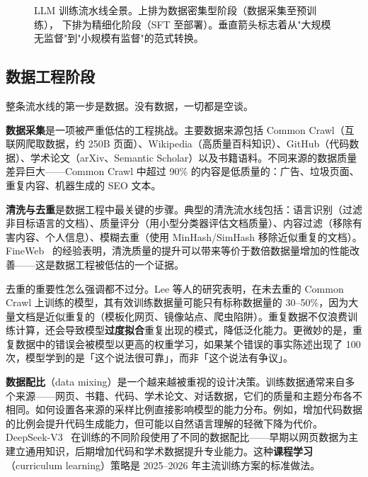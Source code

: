 \begin{figure}[htbp]
\caption{LLM 训练流水线全景。上排为数据密集型阶段（数据采集至预训练），
下排为精细化阶段（SFT 至部署）。垂直箭头标志着从"大规模无监督"到"小规模有监督"的范式转换。}
\label{fig:training-pipeline}
\end{figure}

\subsection{数据工程阶段}

整条流水线的第一步是数据。没有数据，一切都是空谈。

\textbf{数据采集}是一项被严重低估的工程挑战。主要数据来源包括 Common Crawl（互联网爬取数据，约 250B 页面）、Wikipedia（高质量百科知识）、GitHub（代码数据）、学术论文（arXiv、Semantic Scholar）以及书籍语料。不同来源的数据质量差异巨大——Common Crawl 中超过 90\% 的内容是低质量的：广告、垃圾页面、重复内容、机器生成的 SEO 文本。

\textbf{清洗与去重}是数据工程中最关键的步骤。典型的清洗流水线包括：语言识别（过滤非目标语言的文档）、质量评分（用小型分类器评估文档质量）、内容过滤（移除有害内容、个人信息）、模糊去重（使用 MinHash/SimHash 移除近似重复的文档）。FineWeb~\cite{penedo2024fineweb} 的经验表明，清洗质量的提升可以带来等价于数倍数据量增加的性能改善——这是数据工程被低估的一个证据。

去重的重要性怎么强调都不过分。Lee 等人的研究表明，在未去重的 Common Crawl 上训练的模型，其有效训练数据量可能只有标称数据量的 30--50\%，因为大量文档是近似重复的（模板化网页、镜像站点、爬虫陷阱）。重复数据不仅浪费训练计算，还会导致模型\textbf{过度拟合}重复出现的模式，降低泛化能力。更微妙的是，重复数据中的错误会被模型以更高的权重学习，如果某个错误的事实陈述出现了 100 次，模型学到的是「这个说法很可靠」，而非「这个说法有争议」。

\textbf{数据配比}（data mixing）是一个越来越被重视的设计决策。训练数据通常来自多个来源——网页、书籍、代码、学术论文、对话数据，它们的质量和主题分布各不相同。如何设置各来源的采样比例直接影响模型的能力分布。例如，增加代码数据的比例会提升代码生成能力，但可能以自然语言理解的轻微下降为代价。DeepSeek-V3~\cite{deepseekv3} 在训练的不同阶段使用了不同的数据配比——早期以网页数据为主建立通用知识，后期增加代码和学术数据提升专业能力。这种\textbf{课程学习}（curriculum learning）策略是 2025--2026 年主流训练方案的标准做法。

